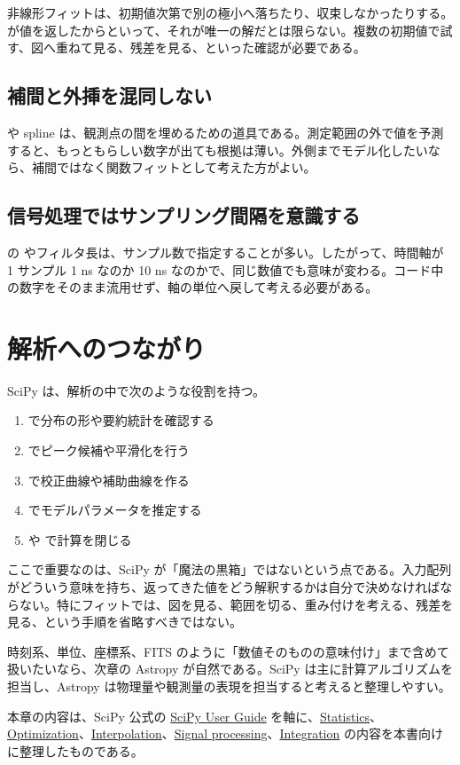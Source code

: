 非線形フィットは、初期値次第で別の極小へ落ちたり、収束しなかったりする。 が値を返したからといって、それが唯一の解だとは限らない。複数の初期値で試す、図へ重ねて見る、残差を見る、といった確認が必要である。

\subsection{補間と外挿を混同しない}

 や spline は、観測点の間を埋めるための道具である。測定範囲の外で値を予測すると、もっともらしい数字が出ても根拠は薄い。外側までモデル化したいなら、補間ではなく関数フィットとして考えた方がよい。

\subsection{信号処理ではサンプリング間隔を意識する}

 の  やフィルタ長は、サンプル数で指定することが多い。したがって、時間軸が 1 サンプル 1 ns なのか 10 ns なのかで、同じ数値でも意味が変わる。コード中の数字をそのまま流用せず、軸の単位へ戻して考える必要がある。

\section{解析へのつながり}

SciPy は、解析の中で次のような役割を持つ。

\begin{enumerate}
\item {} で分布の形や要約統計を確認する
\item {} でピーク候補や平滑化を行う
\item {} で校正曲線や補助曲線を作る
\item {} でモデルパラメータを推定する
\item {} や  で計算を閉じる
\end{enumerate}

ここで重要なのは、SciPy が「魔法の黒箱」ではないという点である。入力配列がどういう意味を持ち、返ってきた値をどう解釈するかは自分で決めなければならない。特にフィットでは、図を見る、範囲を切る、重み付けを考える、残差を見る、という手順を省略すべきではない。

時刻系、単位、座標系、FITS のように「数値そのものの意味付け」まで含めて扱いたいなら、次章の Astropy が自然である。SciPy は主に計算アルゴリズムを担当し、Astropy は物理量や観測量の表現を担当すると考えると整理しやすい。

本章の内容は、SciPy 公式の \href{https://docs.scipy.org/doc/scipy/tutorial/}{SciPy User Guide} を軸に、\href{https://docs.scipy.org/doc/scipy/tutorial/stats.html}{Statistics}、\href{https://docs.scipy.org/doc/scipy/tutorial/optimize.html}{Optimization}、\href{https://docs.scipy.org/doc/scipy/tutorial/interpolate.html}{Interpolation}、\href{https://docs.scipy.org/doc/scipy/tutorial/signal.html}{Signal processing}、\href{https://docs.scipy.org/doc/scipy/tutorial/integrate.html}{Integration} の内容を本書向けに整理したものである。

